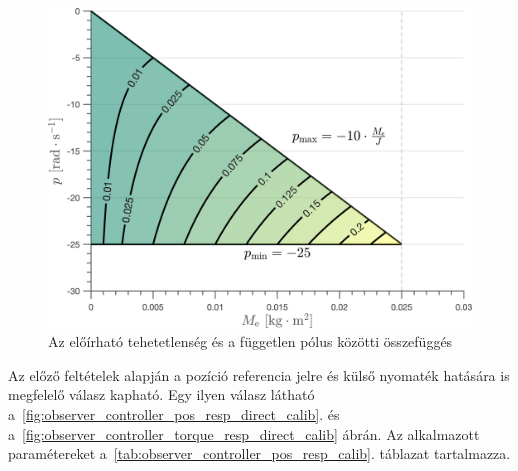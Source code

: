 \begin{figure}[H]
    \begin{center}
    \includegraphics[width=\textwidth]{images/observer_controller_param_limits.png}
    \caption{Az előírható tehetetlenség és a független pólus közötti összefüggés}\label{fig:observer_controller_param_limits}
    \end{center}
\end{figure}

Az előző feltételek alapján a pozíció referencia jelre és külső nyomaték hatására is megfelelő válasz kapható.
Egy ilyen válasz látható a~\ref{fig:observer_controller_pos_resp_direct_calib}. 
és a~\ref{fig:observer_controller_torque_resp_direct_calib} ábrán. 
Az alkalmazott paramétereket a~\ref{tab:observer_controller_pos_resp_calib}. táblazat tartalmazza.

